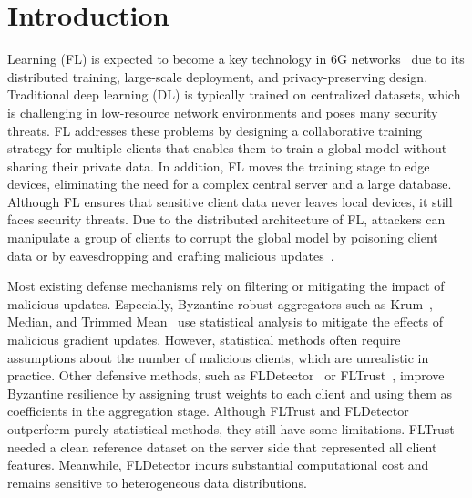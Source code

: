 \documentclass[journal]{IEEEtran}
\begin{document}
\section{Introduction}
\label{sec:introduction}


 Learning (FL) is expected to become a key technology in 6G networks~\cite{sandeepa2025federated} due to its distributed training, large-scale deployment, and privacy-preserving design. Traditional deep learning (DL) is typically trained on centralized datasets, which is challenging in low-resource network environments and poses many security threats. FL addresses these problems by designing a collaborative training strategy for multiple clients that enables them to train a global model without sharing their private data. In addition, FL moves the training stage to edge devices, eliminating the need for a complex central server and a large database.  Although FL ensures that sensitive client data never leaves local devices, it still faces security threats. Due to the distributed architecture of FL, attackers can manipulate a group of clients to corrupt the global model by poisoning client data or by eavesdropping and crafting malicious updates~\cite{baruch2019little, fang2020local, shejwalkar2021manipulating}.

Most existing defense mechanisms rely on filtering or mitigating the impact of malicious updates. Especially, Byzantine-robust aggregators such as Krum~\cite{blanchard2017machine}, Median, and Trimmed Mean~\cite{yin2018byzantine} use statistical analysis to mitigate the effects of malicious gradient updates. However, statistical methods often require assumptions about the number of malicious clients, which are unrealistic in practice. Other defensive methods, such as FLDetector~\cite{zhang2022fldetector} or FLTrust~\cite{cao2020fltrust}, improve Byzantine resilience by assigning trust weights to each client and using them as coefficients in the aggregation stage. Although FLTrust and FLDetector outperform purely statistical methods, they still have some limitations. FLTrust needed a clean reference dataset on the server side that represented all client features. Meanwhile, FLDetector incurs substantial computational cost and remains sensitive to heterogeneous data distributions.
\end{document}
